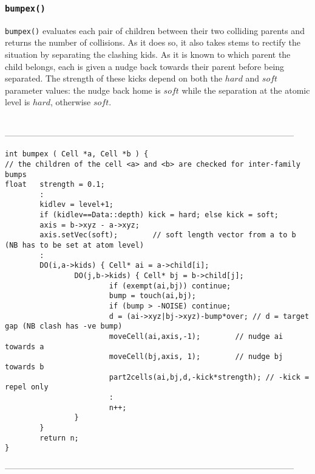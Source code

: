 \subsubsection{{\tt bumpex()}}

{\tt bumpex()} evaluates each pair of children between their two colliding parents
and returns the number of collisions.  As it does so, it also takes stems to rectify the
situation by separating the clashing kids.  As it is known to which parent the child belongs,
each is given a nudge back towards their parent before being separated. 
The strength of these kicks depend on both the $hard$ and $soft$ parameter values:
the nudge back home is $soft$ while the separation at the atomic level is $hard$,
otherwise $soft$.  
\begin{singlespace}
\ \\
------------------------------------------------------------------------------------------------------
\begin{tiny}
\begin{verbatim}
int bumpex ( Cell *a, Cell *b ) {
// the children of the cell <a> and <b> are checked for inter-family bumps
float   strength = 0.1;
        :
        kidlev = level+1;
        if (kidlev==Data::depth) kick = hard; else kick = soft;
        axis = b->xyz - a->xyz;
        axis.setVec(soft);        // soft length vector from a to b (NB has to be set at atom level)
        :
        DO(i,a->kids) { Cell* ai = a->child[i];
                DO(j,b->kids) { Cell* bj = b->child[j];
                        if (exempt(ai,bj)) continue;
                        bump = touch(ai,bj);
                        if (bump > -NOISE) continue;
                        d = (ai->xyz|bj->xyz)-bump*over; // d = target gap (NB clash has -ve bump)
                        moveCell(ai,axis,-1);        // nudge ai towards a
                        moveCell(bj,axis, 1);        // nudge bj towards b
                        part2cells(ai,bj,d,-kick*strength); // -kick = repel only
                        :
                        n++;
                }
        }
        return n;
}
\end{verbatim}
\end{tiny}
------------------------------------------------------------------------------------------------------
\end{singlespace}

